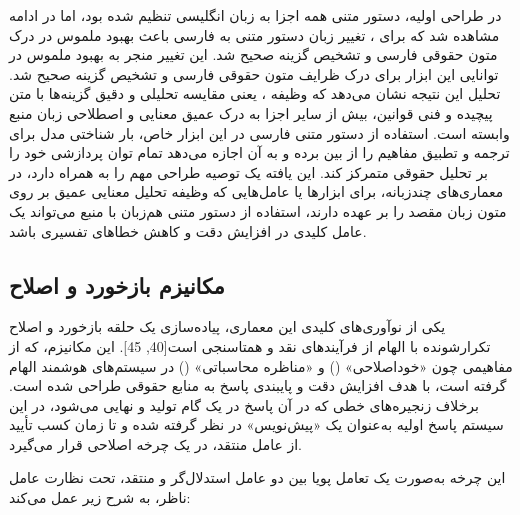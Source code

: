 \documentclass[12pt,a4paper]{report}
\begin{document}
	
	در طراحی اولیه، دستور متنی همه اجزا به زبان انگلیسی تنظیم شده بود، اما در ادامه مشاهده شد که برای ، تغییر زبان دستور متنی به فارسی باعث بهبود ملموس در درک متون حقوقی فارسی و تشخیص گزینه صحیح شد. این تغییر منجر به بهبود ملموس در توانایی این ابزار برای درک ظرایف متون حقوقی فارسی و تشخیص گزینه صحیح شد. تحلیل این نتیجه نشان می‌دهد که وظیفه ، یعنی مقایسه تحلیلی و دقیق گزینه‌ها با متن پیچیده و فنی قوانین، بیش از سایر اجزا به درک عمیق معنایی و اصطلاحی زبان منبع وابسته است. استفاده از دستور متنی فارسی در این ابزار خاص، بار شناختی مدل برای ترجمه و تطبیق مفاهیم را از بین برده و به آن اجازه می‌دهد تمام توان پردازشی خود را بر تحلیل حقوقی متمرکز کند. این یافته یک توصیه طراحی مهم را به همراه دارد، در معماری‌های چندزبانه، برای ابزارها یا عامل‌هایی که وظیفه تحلیل معنایی عمیق بر روی متون زبان مقصد را بر عهده دارند، استفاده از دستور متنی هم‌زبان با منبع می‌تواند یک عامل کلیدی در افزایش دقت و کاهش خطاهای تفسیری باشد.
	
	\subsection{مکانیزم بازخورد و اصلاح}
	
	یکی از نوآوری‌های کلیدی این معماری، پیاده‌سازی یک حلقه بازخورد و اصلاح تکرارشونده با الهام از فرآیندهای نقد و همتاسنجی  است[40, 45]. این مکانیزم، که از مفاهیمی چون «خوداصلاحی» () و «مناظره محاسباتی» () در سیستم‌های هوشمند الهام گرفته است، با هدف افزایش دقت و پایبندی پاسخ به منابع حقوقی طراحی شده است. برخلاف زنجیره‌های خطی که در آن پاسخ در یک گام تولید و نهایی می‌شود، در این سیستم پاسخ اولیه به‌عنوان یک «پیش‌نویس» در نظر گرفته شده و تا زمان کسب تأیید از عامل منتقد، در یک چرخه اصلاحی قرار می‌گیرد.
	
	این چرخه به‌صورت یک تعامل پویا بین دو عامل استدلال‌گر و منتقد، تحت نظارت عامل ناظر، به شرح زیر عمل می‌کند:
	
\end{document}
